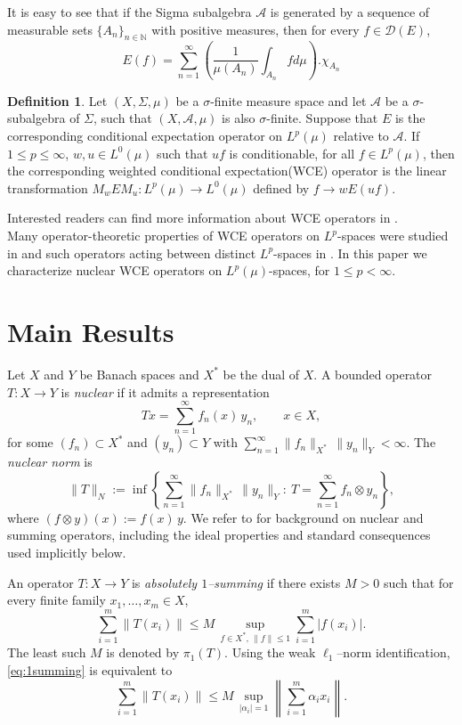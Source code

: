 \documentclass{amsart}
\theoremstyle{definition}\newtheorem{defn}[thm]{Definition}
\theoremstyle{remark}
\numberwithin{equation}{section}
\begin{document}
It is easy to see that if the Sigma subalgebra $\mathcal{A}$ is generated by a sequence of measurable sets $\{A_n\}_{n\in \mathbb{N}}$ with positive measures, then for every $f\in\mathcal{D}(E)$,
$$E(f)=\sum_{n=1}^{\infty}\left(\frac{1}{\mu(A_n)}\int_{A_n}fd\mu\right).\chi_{A_n}$$

\begin{defn}
Let $(X,\Sigma,\mu)$ be a $\sigma$-finite measure space and let $\mathcal{A}$ be a
$\sigma$-subalgebra of $\Sigma$, such that $(X,\mathcal{A},\mu)$ is also $\sigma$-finite. Suppose that $E$ is the corresponding conditional
expectation operator on $L^p(\mu)$ relative to $\mathcal{A}$. If $1\leq p\leq\infty$, $w,u \in L^0(\mu)$ such that $uf$ is conditionable, for all $f\in L^p(\mu)$, then the corresponding weighted conditional expectation(WCE) operator is the linear
transformation $M_wEM_u:L^p(\mu)\rightarrow L^0(\mu)$ defined by $f\rightarrow wE(uf)$.
\end{defn}
Interested readers can find more information about WCE operators in \cite{ej,her,dhd}.\\
Many operator-theoretic properties of WCE operators on $L^p$-spaces were studied in \cite{e2,e,e1,ej,her,dhd} and such operators acting between distinct $L^p$-spaces in \cite{ej, ej2}. In this paper we characterize nuclear WCE operators on $L^p(\mu)$-spaces, for $1\leq p<\infty$.

\section{ \sc\bf Main Results}
Let $X$ and $Y$ be Banach spaces and $X^*$ be the dual of $X$.
A bounded operator $T:X\to Y$ is \emph{nuclear} if it admits a representation
\begin{equation}\label{A}
Tx=\sum_{n=1}^{\infty} f_n(x)\,y_n,
\qquad x\in X,
\end{equation}
for some $(f_n)\subset X^*$ and $(y_n)\subset Y$ with
$\sum_{n=1}^{\infty}\|f_n\|_{X^*}\,\|y_n\|_{Y}<\infty$.
The \emph{nuclear norm} is
\[
\|T\|_{N}
:=\inf\left\{\sum_{n=1}^{\infty}\|f_n\|_{X^*}\,\|y_n\|_{Y}:\ T=\sum_{n=1}^{\infty} f_n\otimes y_n\right\},
\]
where $(f\otimes y)(x):=f(x)\,y$. We refer to \cite{pi,die} for background on nuclear and summing operators,
including the ideal properties and standard consequences used implicitly below.

\medskip
An operator $T:X\to Y$ is \emph{absolutely $1$--summing} if there exists $M>0$ such that for every finite family
$x_1,\dots,x_m\in X$,
\begin{equation}\label{eq:1summing}
\sum_{i=1}^{m}\|T(x_i)\|
\le M\,\sup_{f\in X^*,\,\|f\|\le 1}\sum_{i=1}^{m}|f(x_i)|.
\end{equation}
The least such $M$ is denoted by $\pi_1(T)$. Using the weak $\ell_1$--norm identification, \eqref{eq:1summing} is equivalent to
\[
\sum_{i=1}^{m}\|T(x_i)\|
\le M\,\sup_{|\alpha_i|=1}\left\|\sum_{i=1}^{m}\alpha_i x_i\right\|.
\]
\end{document}
